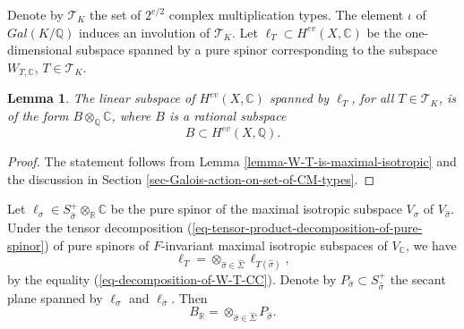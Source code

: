 \documentclass[12pt]{amsart}
\newcommand{\hide}[1]{}
\numberwithin{equation}{subsection}
\theoremstyle{plain}
\newtheorem{lem}[thm]{Lemma}
\theoremstyle{definition}
\newcommand{\CC}{{\mathbb C}}
\newcommand{\QQ}{{\mathbb Q}}
\newcommand{\RR}{{\mathbb R}}
\newcommand{\T}{{\mathcal T}}
\renewcommand{\span}{{\rm span}}
\begin{document}
{%
\hide{
We set (??? these lines are not needed ???)
\[
P_{T'}:=\ell_{W_{T',\CC}}+\ell_{\bar{W}_{T',\CC}}.
\]
If $T'\neq T$, then $P_{T'}$ is a $2$-dimensional $\RR$-subspace of $H^{ev}(X,\RR)$. For our initially chosen CM-type $T$, $P_T$ is a $2$-dimensional $\QQ$-subspace (??? NO, it need not be defined over $\QQ$ ???) of $H^{ev}(X,\QQ)$. If $W_{T,\CC}$ is the image of $H^1(\hat{X},\QQ)\otimes_F K$ via the isometry $g_0$ in Example \ref{example-isometry-g-0}, then 
\[
P_T=\span_\QQ\left\{
\left(1-\hat{\eta}_q(\Theta\wedge_F\Theta)+\dots\right),
\left(\Theta-\hat{\eta}_q(\Theta\wedge_F\Theta\wedge_F\Theta)+\dots\right)
\right\}
\]
(see Equation (\ref{eq-pure-spinor-rho-g-0-of-1})).

}

Denote by $\T_K$ the set of $2^{e/2}$ complex multiplication types. 
The element $\iota$ of $Gal(K/\QQ)$ induces an involution of $\T_K$. Let $\ell_T\subset H^{ev}(X,\CC)$ be the one-dimensional subspace spanned by a pure spinor corresponding to the subspace $W_{T,\CC}$, $T\in\T_K$.

\begin{lem}
\label{lemma-B-is-rational}
The linear subspace of $H^{ev}(X,\CC)$ spanned by $\ell_T$, for all $T\in\T_K$, is of the form $B\otimes_\QQ\CC$, where $B$ is a rational subspace 
\[
B\subset H^{ev}(X,\QQ).
\] 
\end{lem}

\begin{proof}
The statement follows from Lemma \ref{lemma-W-T-is-maximal-isotropic} and the discussion in Section \ref{sec-Galois-action-on-set-of-CM-types}.
\end{proof}

Let $\ell_\sigma\in S^+_{\hat{\sigma}}\otimes_\RR\CC$ be the pure spinor of the maximal isotropic subspace $V_\sigma$ of $V_{\hat{\sigma}}$.
Under the tensor decomposition (\ref{eq-tensor-product-decomposition-of-pure-spinor}) of pure spinors of $F$-invariant maximal isotropic subspaces of $V_\CC$,
we have
\begin{equation}
\label{eq-tensor-factorization-of-ell-T}
\ell_T=\otimes_{\hat{\sigma}\in\hat{\Sigma}}\ell_{T(\hat{\sigma})},
\end{equation}
by the equality (\ref{eq-decomposition-of-W-T-CC}).
Denote by $P_{\hat{\sigma}}\subset S^+_{\hat{\sigma}}$ the secant plane spanned by $\ell_{\sigma}$ and $\ell_{\bar{\sigma}}$.
Then 
\begin{equation}
\label{eq-tensor-factorization-of-B}
B_\RR=\otimes_{\hat{\sigma}\in\hat{\Sigma}}P_{\hat{\sigma}}.
\end{equation}


}
\end{document}
